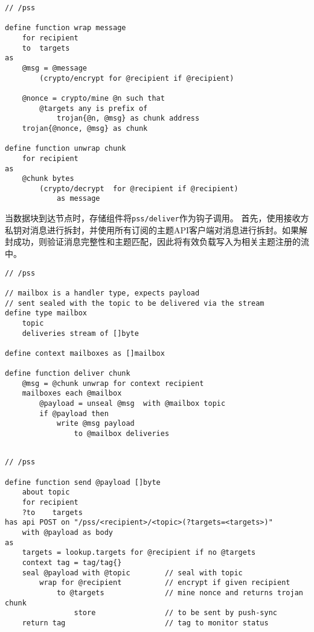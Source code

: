 \begin{definition}\label{def:wrap}
\begin{lstlisting}[language=buzz1]
// /pss

define function wrap message 
    for recipient
    to  targets
as 
    @msg = @message 
        (crypto/encrypt for @recipient if @recipient) 

    @nonce = crypto/mine @n such that
        @targets any is prefix of
            trojan{@n, @msg} as chunk address 
    trojan{@nonce, @msg} as chunk 

define function unwrap chunk
    for recipient
as
    @chunk bytes 
        (crypto/decrypt  for @recipient if @recipient)
            as message

\end{lstlisting}
\end{definition}

当数据块到达节点时，存储组件将\lstinline{pss/deliver}作为钩子调用。
首先，使用接收方私钥对消息进行拆封，并使用所有订阅的主题API客户端对消息进行拆封。如果解封成功，则验证消息完整性和主题匹配，因此将有效负载写入为相关主题注册的流中。

\begin{definition}\label{def:delivery}
\begin{lstlisting}[language=buzz1]
// /pss

// mailbox is a handler type, expects payload
// sent sealed with the topic to be delivered via the stream 
define type mailbox
    topic
    deliveries stream of []byte 
    
define context mailboxes as []mailbox

define function deliver chunk
    @msg = @chunk unwrap for context recipient
    mailboxes each @mailbox 
        @payload = unseal @msg  with @mailbox topic
        if @payload then 
            write @msg payload 
                to @mailbox deliveries 
    

\end{lstlisting}
\end{definition}


\begin{definition}\label{def:send}
\begin{lstlisting}[language=buzz1]
// /pss

define function send @payload []byte
    about topic
    for recipient
    ?to    targets
has api POST on "/pss/<recipient>/<topic>(?targets=<targets>)"
    with @payload as body
as 
    targets = lookup.targets for @recipient if no @targets
    context tag = tag/tag{}
    seal @payload with @topic        // seal with topic
        wrap for @recipient          // encrypt if given recipient
            to @targets              // mine nonce and returns trojan chunk
                store                // to be sent by push-sync
    return tag                       // tag to monitor status 
    
\end{lstlisting}
\end{definition}

